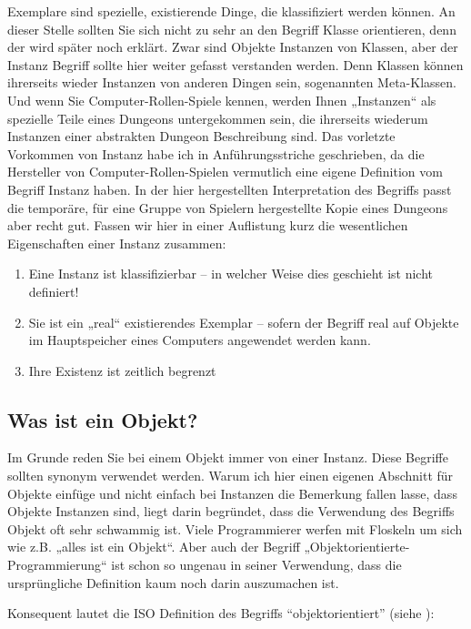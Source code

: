 Exemplare sind spezielle, existierende Dinge, die klassifiziert werden können. An dieser Stelle sollten Sie sich nicht zu sehr an den Begriff Klasse orientieren, denn der wird später noch erklärt. Zwar sind Objekte Instanzen von Klassen, aber der Instanz Begriff sollte hier weiter gefasst verstanden werden. Denn Klassen können ihrerseits wieder Instanzen von anderen Dingen sein, sogenannten Meta-Klassen. Und wenn Sie Computer-Rollen-Spiele kennen, werden Ihnen „Instanzen“ als spezielle Teile eines Dungeons untergekommen sein, die ihrerseits wiederum Instanzen einer abstrakten Dungeon Beschreibung sind. Das vorletzte Vorkommen von Instanz habe ich in Anführungsstriche geschrieben, da die Hersteller von Computer-Rollen-Spielen vermutlich eine eigene Definition vom Begriff Instanz haben. In der hier hergestellten Interpretation des Begriffs passt die temporäre, für eine Gruppe von Spielern hergestellte Kopie eines Dungeons aber recht gut. Fassen wir hier in einer Auflistung kurz die wesentlichen Eigenschaften einer Instanz zusammen: 

\begin{enumerate}
\item Eine Instanz ist klassifizierbar -- in welcher Weise dies geschieht ist nicht definiert!
\item Sie ist ein „real“ existierendes Exemplar -- sofern der Begriff real auf Objekte im Hauptspeicher eines Computers angewendet werden kann.
\item Ihre Existenz ist zeitlich begrenzt
\end{enumerate}


\subsection{Was ist ein Objekt?}

Im Grunde reden Sie bei einem Objekt immer von einer Instanz. Diese Begriffe sollten synonym verwendet werden. Warum ich hier einen eigenen Abschnitt für Objekte einfüge und nicht einfach bei Instanzen die Bemerkung fallen lasse, dass Objekte Instanzen sind, liegt darin begründet, dass die Verwendung des Begriffs Objekt oft sehr schwammig ist. Viele Programmierer werfen mit Floskeln um sich wie z.B. „alles ist ein Objekt“. Aber auch der Begriff „Objektorientierte-Programmierung“ ist schon so ungenau in seiner Verwendung, dass die ursprüngliche Definition kaum noch darin auszumachen ist. 

Konsequent lautet die ISO Definition des Begriffs "`objektorientiert"' (siehe \cite{isooo}):


